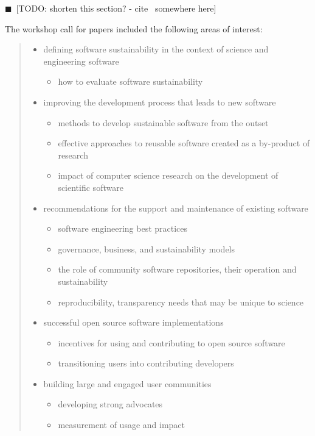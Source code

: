 \documentclass[11pt, oneside]{amsart}
\newcommand{\todo}[1]{{\color{blue}$\blacksquare$~\textsf{[TODO: #1]}}}
\begin{document}
\todo{shorten this section? - cite~\cite{WSSSPE2-pre-report} somewhere here}

The workshop call for papers included the following areas of interest:
\begin{quote}
\begin{itemize} 

\item defining software sustainability in the context of science and engineering
software
\begin{itemize}
\item how to evaluate software sustainability
\end{itemize}

\item improving the development process that leads to new software
\begin{itemize}
\item methods to develop sustainable software from the outset
\item effective approaches to reusable software created as a by-product of
research
\item impact of computer science research on the development of scientific
software
\end{itemize}

\item recommendations for the support and maintenance of existing software
\begin{itemize}
\item software engineering best practices
\item governance, business, and sustainability models
\item the role of community software repositories, their operation and
sustainability
\item reproducibility, transparency needs that may be unique to science
\end{itemize}

\item successful open source software implementations
\begin{itemize}
\item incentives for using and contributing to open source software
\item transitioning users into contributing developers
\end{itemize}

\item building large and engaged user communities
\begin{itemize}
\item developing strong advocates
\item measurement of usage and impact
\end{itemize}


\end{itemize}
\end{quote}
\end{document}

